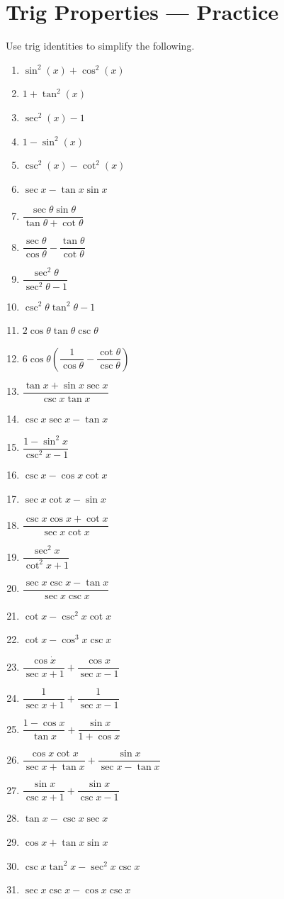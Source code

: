 \documentclass[10pt]{article}
\theoremstyle{definition}
\theoremstyle{plain}
\numberwithin{equation}{section}
\begin{document}
  \newpage

\section*{Trig Properties — Practice}
\begin{multicolblock}{Use trig identities to simplify the following.}
\begin{enumerate}
  \item $\sin^2(x) + \cos^2(x)$
  \item $1 + \tan^2(x)$
  \item $\sec^2(x) - 1$
  \item $1 - \sin^2(x)$
  \item $\csc^2(x) - \cot^2(x)$
  \item $\sec x-\tan x \sin x$
  \item $\dfrac{\sec \theta \sin \theta}{\tan \theta+\cot \theta}$
  \item $\dfrac{\sec \theta}{\cos \theta}-\dfrac{\tan \theta}{\cot \theta}$
  \item $\dfrac{\sec ^2 \theta}{\sec ^2 \theta-1}$
  \item $\csc ^2 \theta \tan ^2 \theta-1$
  \item $2 \cos \theta \tan \theta \csc \theta$
  \item $6 \cos \theta\left(\dfrac{1}{\cos \theta}-\dfrac{\cot \theta}{\csc \theta}\right)$
  \item $\dfrac{\tan x+\sin x \sec x}{\csc x \tan x}$
  \item $\csc x \sec x-\tan x$
  \item $\dfrac{1-\sin ^2 x}{\csc ^2 x-1}$
  \item $\csc x-\cos x \cot x$
  \item $\sec x \cot x-\sin x$
  \item $\dfrac{\csc x \cos x+\cot x}{\sec x \cot x}$
  \item $\dfrac{\sec ^2 x}{\cot ^2 x+1}$
  \item $\dfrac{\sec x \csc x-\tan x}{\sec x \csc x}$
  \item $\cot x-\csc ^2 x \cot x$
  \item $\cot x-\cos ^3 x \csc x$
  \item $\dfrac{\cos \dot{x}}{\sec x+1}+\dfrac{\cos x}{\sec x-1}$
  \item $\dfrac{1}{\sec x+1}+\dfrac{1}{\sec x-1}$
  \item $\dfrac{1-\cos x}{\tan x}+\dfrac{\sin x}{1+\cos x}$
  \item $\dfrac{\cos x \cot x}{\sec x+\tan x}+\dfrac{\sin x}{\sec x-\tan x}$
  \item $\dfrac{\sin x}{\csc x+1}+\dfrac{\sin x}{\csc x-1}$
  \item $\tan x-\csc x \sec x$
  \item $\cos x+\tan x \sin x$
  \item $\csc x \tan ^2 x-\sec ^2 x \csc x$
  \item $\sec x \csc x-\cos x \csc x$
\end{enumerate}
\end{multicolblock}
\end{document}
